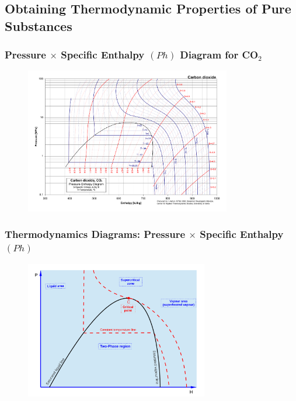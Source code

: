 \documentclass[10pt,compress,handout,unknownkeysallowed]{beamer}
\begin{document}
\subsection{Obtaining Thermodynamic Properties of Pure Substances}
\begin{frame}
 \frametitle{Pressure $\times$ Specific Enthalpy $(Ph)$ Diagram for CO$_{2}$}
  \begin{center}
   \begin{figure}
     \includegraphics[width=9cm,height=8.cm,clip]{../Pics/CO2col}
   \end{figure}
   \end{center}
\end{frame}

\begin{frame}
 \frametitle{Thermodynamics Diagrams: Pressure $\times$ Specific Enthalpy $(Ph)$}
  \begin{center}
   \begin{figure}
      \includegraphics[width=8cm,height=7.cm,clip]{../Pics/Overview_Refrig18}
   \end{figure}
   \end{center}
\end{frame}
\end{document}
